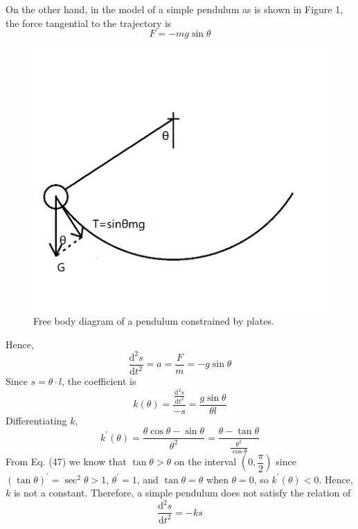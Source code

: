 \documentclass[12pt]{report}
\begin{document}
On the other hand, in the model of a simple pendulum as is shown in Figure 1, the force tangential to the trajectory is
\begin{equation}
    F=-mg\sin{\theta}
\end{equation}
\begin{figure}[H]
    \centering
    \includegraphics[width=0.8\linewidth]{2.png}
    \caption{Free body diagram of a pendulum constrained by plates.}
\end{figure}
Hence,
\begin{equation}
    \dfrac{\mathrm{d}^2s}{\mathrm{d}t^2}=a=\dfrac{F}{m}=-g\sin{\theta}
\end{equation}
Since $s=\theta\cdot l$, the coefficient is
\begin{equation}
    k(\theta)=\dfrac{\frac{\mathrm{d}^2s}{\mathrm{d}t^2}}{-s}=\dfrac{g\sin{\theta}}{\theta l}
\end{equation}
Differentiating $k$,
\begin{equation}
    k^{'}(\theta)=\dfrac{\theta\cos{\theta}-\sin{\theta}}{{\theta}^2}=\dfrac{\theta-\tan{\theta}}{\frac{{\theta}^2}{\cos{\theta}}}
\end{equation}
From Eq. (47) we know that $\tan{\theta}>\theta$ on the interval $\left(0,\dfrac{\pi}{2}\right)$ since $(\tan{\theta})^{'}=\sec^2{\theta}>1$, ${\theta}^{'}=1$, and $\tan{\theta}=\theta$ when $\theta=0$, so $k^{'}(\theta)<0$. Hence, $k$ is not a constant. Therefore, a simple pendulum does not satisfy the relation of
\begin{equation}
    \dfrac{\mathrm{d}^2s}{\mathrm{d}t^2}=-ks
\end{equation}
\end{document}
